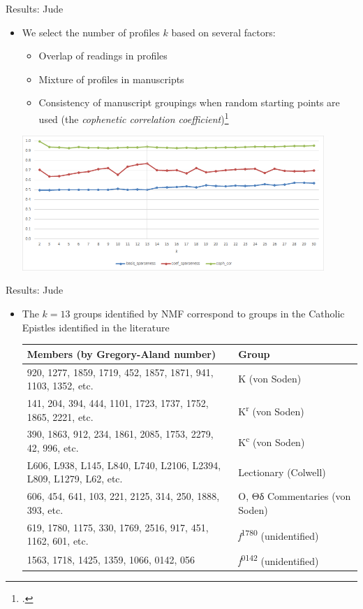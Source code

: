 \documentclass[10pt]{beamer}
\begin{document}
	\begin{frame}{Results: Jude}
		\begin{itemize}
			\item We select the number of profiles $k$ based on several factors:
			\begin{itemize}
				\item Overlap of readings in profiles
				\item Mixture of profiles in manuscripts
				\item Consistency of manuscript groupings when random starting points are used (the \emph{cophenetic correlation coefficient})\footnote{\cite{BTGM04}.}
			\end{itemize}
			\begin{center}
				\includegraphics[width=0.90\textwidth]{../graphics/jude_uniform_rank_est.png}
			\end{center}
		\end{itemize}
	\end{frame}
	\begin{frame}{Results: Jude}
		\begin{itemize}
			\item The $k = 13$ groups identified by NMF correspond to groups in the Catholic Epistles identified in the literature
			\begin{center}
				\matrixfont
				\footnotesize
				\begin{tabular}{p{2.5in}p{1.25in}}
					Members (by Gregory-Aland number) & Group\\
					\hline
					920, 1277, 1859, 1719, 452, 1857, 1871, 941, 1103, 1352, etc. & Κ (von Soden)\\
					\hline
					141, 204, 394, 444, 1101, 1723, 1737, 1752, 1865, 2221, etc. & Κ\textsuperscript{r} (von Soden)\\
					\hline
					390, 1863, 912, 234, 1861, 2085, 1753, 2279, 42, 996, etc. & Κ\textsuperscript{c} (von Soden)\\
					\hline
					L606, L938, L145, L840, L740, L2106, L2394, L809, L1279, L62, etc. & Lectionary (Colwell)\\
					\hline
					606, 454, 641, 103, 221, 2125, 314, 250, 1888, 393, etc. & Ο, Θδ Commentaries (von Soden)\\
					\hline
					619, 1780, 1175, 330, 1769, 2516, 917, 451, 1162, 601, etc. & \emph{f}\textsuperscript{1780} (unidentified)\\
					\hline
					1563, 1718, 1425, 1359, 1066, 0142, 056 & \emph{f}\textsuperscript{0142} (unidentified)
				\end{tabular}
			\end{center}
		\end{itemize}
	\end{frame}
\end{document}
